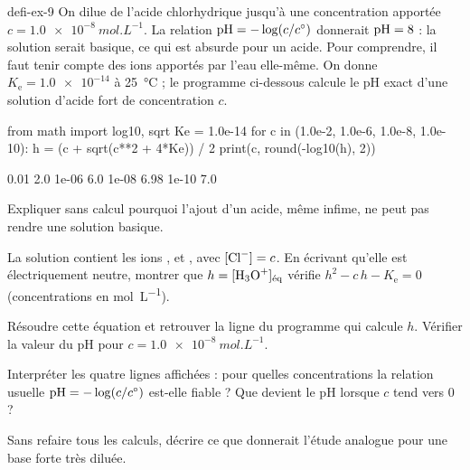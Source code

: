 \begin{blocEdition}{defi-ex-9}
On dilue de l'acide chlorhydrique jusqu'à une concentration apportée $c=\qty{1,0e-8}{mol.L^{-1}}$. La relation
$\mathrm{pH}=-\log(c/c^{\circ})$ donnerait $\mathrm{pH}=8$ : la solution serait basique, ce qui est absurde pour un acide. Pour comprendre,
il faut tenir compte des ions apportés par l'eau elle-même. On donne $K_\mathrm{e}=\num{1.0e-14}$ à 25~°C ; le programme
ci-dessous calcule le pH exact d'une solution d'acide fort de concentration $c$.
\begin{codecote}[0.66]
\begin{pythoncol}
from math import log10, sqrt
Ke = 1.0e-14
for c in (1.0e-2, 1.0e-6, 1.0e-8, 1.0e-10):
    h = (c + sqrt(c**2 + 4*Ke)) / 2
    print(c, round(-log10(h), 2))
\end{pythoncol}
\cote
\begin{consolecol}
0.01 2.0
1e-06 6.0
1e-08 6.98
1e-10 7.0
\end{consolecol}
\end{codecote}
\begin{questions}
\item Expliquer sans calcul pourquoi l'ajout d'un acide, même infime, ne peut pas rendre une solution basique.
\item La solution contient les ions ,  et , avec $[\ce{Cl-}]=c$. En écrivant qu'elle est
électriquement neutre, montrer que $h=[\ce{H3O+}]_\text{éq}$ vérifie $h^2-c\,h-K_\mathrm{e}=0$ (concentrations en
\unit{mol.L^{-1}}).
\item Résoudre cette équation et retrouver la ligne du programme qui calcule $h$. Vérifier la valeur du pH pour
$c=\qty{1,0e-8}{mol.L^{-1}}$.
\item Interpréter les quatre lignes affichées : pour quelles concentrations la relation usuelle $\mathrm{pH}=-\log(c/c^{\circ})$
est-elle fiable ? Que devient le pH lorsque $c$ tend vers 0 ?
\item Sans refaire tous les calculs, décrire ce que donnerait l'étude analogue pour une base forte très diluée.
\end{questions}
\end{blocEdition}

